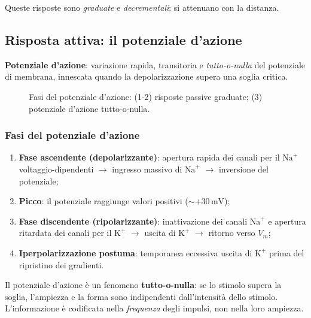\documentclass[11pt,a4paper,italian,twoside]{report}
\theoremstyle{definition} %
\begin{document}
Queste risposte sono \textit{graduate} e \textit{decrementali}: si attenuano con la distanza.

\subsection{Risposta attiva: il potenziale d'azione}
\label{subsec:potenziale_azione}

\begin{definizione}
\textbf{Potenziale d'azione}: variazione rapida, transitoria e \textit{tutto-o-nulla} del potenziale di membrana, innescata quando la depolarizzazione supera una soglia critica.
\end{definizione}

\begin{figure}[htbp]
  \centering
  \caption{Fasi del potenziale d'azione: (1-2) risposte passive graduate; (3) potenziale d'azione tutto-o-nulla.}
  \label{fig:pa_fasi}
\end{figure}

\subsubsection*{Fasi del potenziale d'azione}
\begin{enumerate}
  \item \textbf{Fase ascendente (depolarizzante)}: apertura rapida dei canali per il \(\mathrm{Na}^+\) voltaggio-dipendenti $\rightarrow$ ingresso massivo di \(\mathrm{Na}^+\) $\rightarrow$ inversione del potenziale;
  \item \textbf{Picco}: il potenziale raggiunge valori positivi (\(\sim +30\,\mathrm{mV}\));
  \item \textbf{Fase discendente (ripolarizzante)}: inattivazione dei canali \(\mathrm{Na}^+\) e apertura ritardata dei canali per il \(\mathrm{K}^+\) $\rightarrow$ uscita di \(\mathrm{K}^+\) $\rightarrow$ ritorno verso \(V_m\);
  \item \textbf{Iperpolarizzazione postuma}: temporanea eccessiva uscita di \(\mathrm{K}^+\) prima del ripristino dei gradienti.
\end{enumerate}

\begin{concetto}
Il potenziale d'azione è un fenomeno \textbf{tutto-o-nulla}: se lo stimolo supera la soglia, l'ampiezza e la forma sono indipendenti dall'intensità dello stimolo. L'informazione è codificata nella \textit{frequenza} degli impulsi, non nella loro ampiezza.
\end{concetto}
\end{document}
